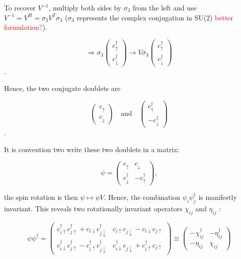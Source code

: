 \documentclass[../../../main.tex]{subfiles}
\begin{document}
To recover $V^{-1}$, multiply both sides by $\sigma_3$ from the left and use $V^{-1} = V^H = \sigma_3 V^T \sigma_3$ ($\sigma_3$ represents the complex conjugation in SU(2) \textcolor{red}{better formulation?}). 

\begin{equation}
\Rightarrow\sigma_3
\begin{pmatrix}
c_\uparrow^\dagger \\
c_\downarrow^\dagger
\end{pmatrix}\rightarrow
V \sigma_3
\begin{pmatrix}
c_\uparrow^\dagger \\
c_\downarrow^\dagger
\end{pmatrix}\end{equation}.

Hence, the two conjugate doublets are

\begin{equation}
\begin{pmatrix}
c_\uparrow \\
c_\downarrow
\end{pmatrix}
\quad
\text{and}
\quad
\begin{pmatrix}
c_\uparrow^\dagger \\
-c_\downarrow^\dagger
\end{pmatrix}
\end{equation}.

It is convention two write these two doublets in a matrix:

\begin{equation}
\psi = 
\begin{pmatrix}
c_\uparrow & c_\downarrow \\
c_\downarrow^\dagger & 	-c_\uparrow^\dagger 		 
\end{pmatrix},
\end{equation}

	the spin rotation is then $\psi \mapsto \psi V$. Hence, the combination $\psi_i\psi_j^\dagger$ is manifestly invariant. This reveals two rotationally invariant operators $\chi_{ij}$ and $\eta_{ij}$ : 

\begin{equation}
	\psi\psi^\dagger = 
	\begin{pmatrix}
		c_{i\uparrow}^\dagger c_{j\uparrow}^\dagger + c_{i\downarrow}c_{j\downarrow}^\dagger & c_{i\uparrow}c_{j\downarrow} - c_{i\downarrow}c_{j\uparrow} \\
		c_{i\downarrow}^\dagger c_{j\uparrow}^\dagger - c_{i\uparrow}^\dagger c_{j\downarrow}^\dagger & c_{i\downarrow}^\dagger c_{j\downarrow} + c_{i\uparrow}^\dagger c_{j\uparrow}
	\end{pmatrix} \equiv
	\begin{pmatrix}
		- \chi_{ij}^\dagger & - \eta_{ij}^\dagger \\
		- \eta_{ij} & \chi_{ij}
	\end{pmatrix}
\end{equation}
\end{document}

